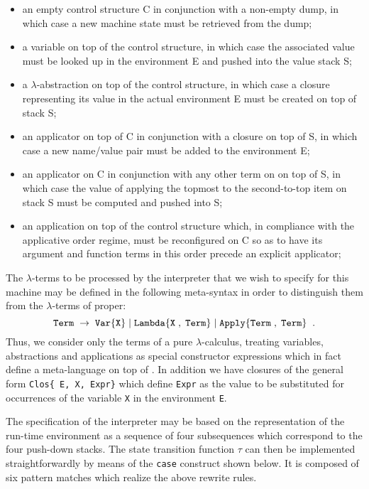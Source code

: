 \begin{itemize}
\item an empty control structure C in conjunction with a non-empty dump,
in which case a new machine state must be retrieved from the dump;
\item a variable on top of the control structure, in which case the associated
value must be looked up in the environment E and pushed into the value stack
S;
\item a $\lambda$-abstraction on top of the control structure, in which case
a closure representing its value in the actual environment E must be created
on top of stack S;
\item an applicator on top of C in conjunction with a closure on top
of S, in which case a new name/value pair must be added to the environment E;
\item an applicator on C in conjunction with any other term on on top of
S, in which case the value of applying the topmost to the second-to-top 
item on stack S must be computed and pushed into S;
\item an application on top of the control structure which, in compliance with
the applicative order regime, must be reconfigured on C so as to have its
argument and function terms in this order precede an explicit applicator;
\end{itemize}

The $\lambda$-terms to be processed by the interpreter that we wish to
specify for this machine may be defined in the following meta-syntax in order
to distinguish them from the $\lambda$-terms of \kir proper:
$$
{\tt Term\;\rightarrow\;Var\{X\}\;|\;Lambda\{X\;,\;Term\}\;|\;Apply\{Term\;,\;Term\}} \;\;.
$$
Thus, we consider only the terms of a pure $\lambda$-calculus, treating
variables, abstractions and applications as special constructor expressions
which in fact define a meta-language on top of \kir. In addition we have 
{\mys closures} of the general form {\tt Clos\{ E, X, Expr\}} which define {\tt Expr} as the value to be substituted for occurrences of the variable {\tt X} in the environment {\tt E}.

The specification of the interpreter may be based on the representation of the run-time environment as a sequence
of four subsequences which correspond to the four push-down stacks.
The state transition
 function $\tau$ can then be implemented straightforwardly
by means of the {\tt case} construct shown below. It is composed of six pattern
matches which realize the above rewrite rules.

